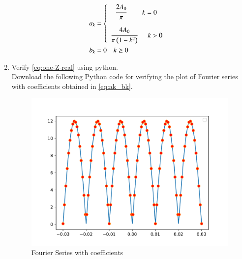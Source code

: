 \documentclass[journal,12pt,twocolumn]{IEEEtran}
\renewcommand\thesection{\arabic{section}}
\begin{document}
\begin{enumerate}[label=\thesection.\arabic*,ref=\thesection.\theenumi]
\begin{align}
&a_k = 
	\begin{cases}
		\quad \cfrac{2 A_0}{\pi} \hspace{2.3em} k = 0 \vspace{1em} \\ \, \, \cfrac{4 A_0}{\pi \brak{1 - k^2}} \hspace{1.5em} k > 0
	\end{cases} \\ 
	\vspace{2em} &b_k = 0 \hspace{1em} k \geq 0
\label{eq:ak_bk}
\end{align}


\item Verify 
\eqref{eq:one-Z-real}
using python. \\
\solution
Download the following Python code for verifying the plot of Fourier series with coefficients obtained in \eqref{eq:ak_bk}.
\begin{figure}[!ht]
	\includegraphics[width=\columnwidth]{figs/2_6.pdf}
	\caption{Fourier Series with coefficients}
\end{figure}
\end{enumerate}
\end{document}
